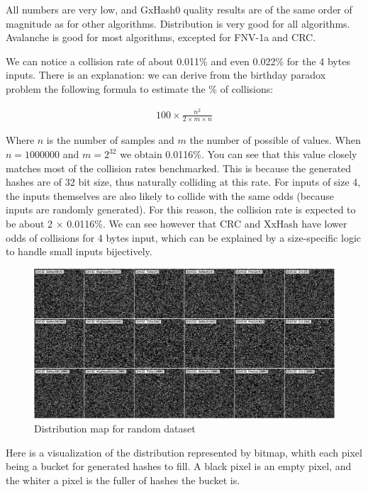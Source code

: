 \documentclass[10pt]{article}
\begin{document}
All numbers are very low, and GxHash0 quality results are of the same order of magnitude as for other algorithms. Distribution is very good for all algorithms. Avalanche is good for most algorithms, excepted for FNV-1a and CRC.

We can notice a collision rate of about 0.011\% and even 0.022\% for the 4 bytes inputs. There is an explanation: we can derive from the birthday paradox problem the following formula to
estimate the \% of collisions:

\begin{align*}
    100 \times \frac{n^2}{2 \times m \times n}
\end{align*}

Where \(n\) is the number of samples and \(m\) the number of possible of values. When \(n=1000000\) and \(m=2^{32}\) we obtain 0.0116\%.
You can see that this value closely matches most of the collision rates benchmarked. This is because the generated hashes are of 32 bit size,
thus naturally colliding at this rate. For inputs of size 4, the inputs themselves are also likely to collide with the same odds (because inputs are randomly generated). For this reason, the collision rate is expected to be about 2 \(\times\) 0.0116\%.
We can see however that CRC and XxHash have lower odds of collisions for 4 bytes input, which can be explained by a size-specific logic to handle small inputs bijectively.

\begin{figure}[H]
\centering
\includegraphics[width=1\textwidth]{quality-random.png}
\caption{Distribution map for random dataset}
\label{fig:quality-random}
\end{figure}

Here is a visualization of the distribution represented by bitmap, whith each pixel being a bucket for generated hashes to fill. A black pixel is an empty pixel, and the whiter a pixel is the fuller of hashes the bucket is. 
\end{document}
